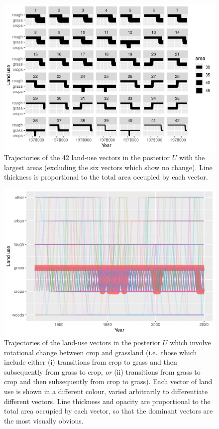 \documentclass[
]{book}
\begin{document}
\begin{figure}
\centering
\includegraphics{Results_wa_files/figure-latex/plotv2-1.pdf}
\caption{\label{fig:plotv2}Trajectories of the 42 land-use vectors in the posterior \(U\) with the largest areas (excluding the six vectors which show no change). Line thickness is proportional to the total area occupied by each vector.}
\end{figure}

\begin{figure}
\centering
\includegraphics{Results_wa_files/figure-latex/plotcgr-1.pdf}
\caption{\label{fig:plotcgr}Trajectories of the land-use vectors in the posterior \(U\) which involve rotational change between crop and grassland (i.e.~those which include either (i) transitions from crop to grass and then subsequently from grass to crop, \emph{or} (ii) transitions from grass to crop and then subsequently from crop to grass). Each vector of land use is shown in a different colour, varied arbitrarily to differentiate different vectors. Line thickness and opacity are proportional to the total area occupied by each vector, so that the dominant vectors are the most visually obvious.}
\end{figure}
\end{document}
